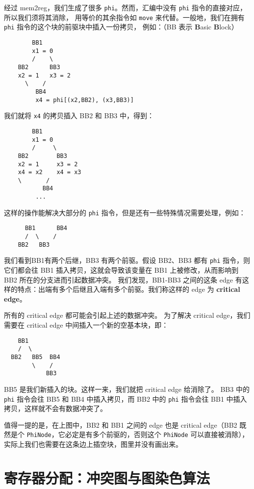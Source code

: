 经过 mem2reg，我们生成了很多 \texttt{phi}。然而，汇编中没有 \texttt{phi} 指令的直接对应，所以我们须将其消除，
用等价的其余指令如 \texttt{move} 来代替。一般地，我们在拥有 \texttt{phi} 指令的这个块的前驱块中插入一份拷贝，
例如：（BB 表示 \textbf{B}asic \textbf{B}lock）
\begin{lstlisting}
        BB1
        x1 = 0
        /    \
    BB2      BB3
    x2 = 1   x3 = 2
      \    /
         BB4
         x4 = phi[(x2,BB2), (x3,BB3)]
\end{lstlisting}

我们就将 \texttt{x4} 的拷贝插入 BB2 和 BB3 中，得到：
\begin{lstlisting}
        BB1
        x1 = 0
        /     \
    BB2        BB3
    x2 = 1     x3 = 2
    x4 = x2    x4 = x3
    \       /
           BB4
         ...
\end{lstlisting}

这样的操作能解决大部分的 \texttt{phi} 指令，但是还有一些特殊情况需要处理，例如：
\begin{lstlisting}
      BB1      BB4
      /  \    /
    BB2   BB3
\end{lstlisting}

我们看到BB1有两个后继，BB3 有两个前驱。假设 BB2、BB3 都有 \texttt{phi} 指令，则它们都会往
BB1 插入拷贝，这就会导致该变量在 BB1 上被修改，从而影响到 BB2 所在的分支进而引起数据冲突。
我们发现，BB1-BB3 之间的这条 edge 有这样的特点：出端有多个后继且入端有多个前驱。我们称这样的
edge 为 \textbf{critical edge}。

所有的 critical edge 都可能会引起上述的数据冲突。
为了解决 critical edge，我们需要在 critical edge 中间插入一个新的空基本块，即：
\begin{lstlisting}
    BB1    
    /  \       
  BB2   BB5  BB4
        \    /   
            BB3     
\end{lstlisting}


BB5 是我们新插入的块。这样一来，我们就把 critical edge 给消除了。
BB3 中的 \texttt{phi} 指令会往 BB5 和 BB4 中插入拷贝，而 BB2 中的 \texttt{phi} 指令会往
BB1 中插入拷贝，这样就不会有数据冲突了。

值得一提的是，在上图中，BB2 和 BB1 之间的 edge 也是 critical edge（BB2 既然是个
\texttt{PhiNode}，它必定是有多个前驱的，否则这个 \texttt{PhiNode} 可以直接被消除），
实际上我们也需要在这条边上插空块，图里并没有画出来。
\section{寄存器分配：冲突图与图染色算法}

